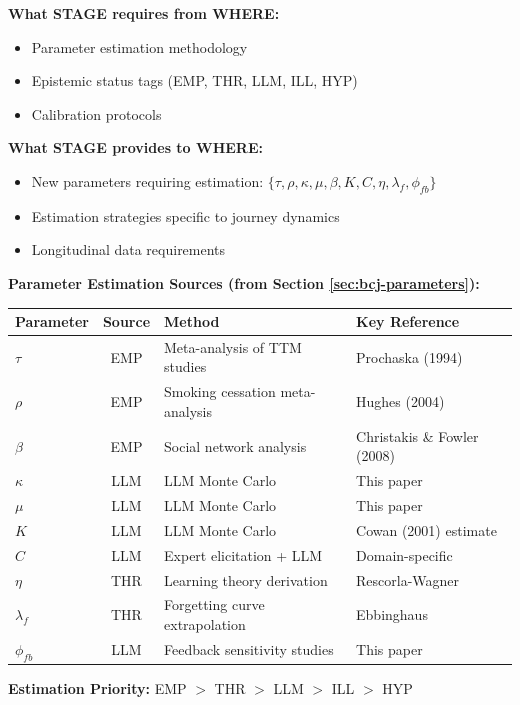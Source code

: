 \begin{tcolorbox}[colback=blue!5!white, colframe=blue!75!black,
    title=Integration: STAGE $\leftrightarrow$ WHERE]

\textbf{What STAGE requires from WHERE:}
\begin{itemize}[nosep]
\item Parameter estimation methodology
\item Epistemic status tags (EMP, THR, LLM, ILL, HYP)
\item Calibration protocols
\end{itemize}

\textbf{What STAGE provides to WHERE:}
\begin{itemize}[nosep]
\item New parameters requiring estimation: $\{\tau, \rho, \kappa, \mu, \beta, K, C, \eta, \lambda_f, \phi_{fb}\}$
\item Estimation strategies specific to journey dynamics
\item Longitudinal data requirements
\end{itemize}

\textbf{Parameter Estimation Sources (from Section \ref{sec:bcj-parameters}):}
\begin{center}
\begin{tabular}{lcll}
\toprule
\textbf{Parameter} & \textbf{Source} & \textbf{Method} & \textbf{Key Reference} \\
\midrule
$\tau$ & EMP & Meta-analysis of TTM studies & Prochaska (1994) \\
$\rho$ & EMP & Smoking cessation meta-analysis & Hughes (2004) \\
$\beta$ & EMP & Social network analysis & Christakis \& Fowler (2008) \\
$\kappa$ & LLM & LLM Monte Carlo & This paper \\
$\mu$ & LLM & LLM Monte Carlo & This paper \\
$K$ & LLM & LLM Monte Carlo & Cowan (2001) estimate \\
$C$ & LLM & Expert elicitation + LLM & Domain-specific \\
$\eta$ & THR & Learning theory derivation & Rescorla-Wagner \\
$\lambda_f$ & THR & Forgetting curve extrapolation & Ebbinghaus \\
$\phi_{fb}$ & LLM & Feedback sensitivity studies & This paper \\
\bottomrule
\end{tabular}
\end{center}

\textbf{Estimation Priority:} EMP $>$ THR $>$ LLM $>$ ILL $>$ HYP
\end{tcolorbox}

